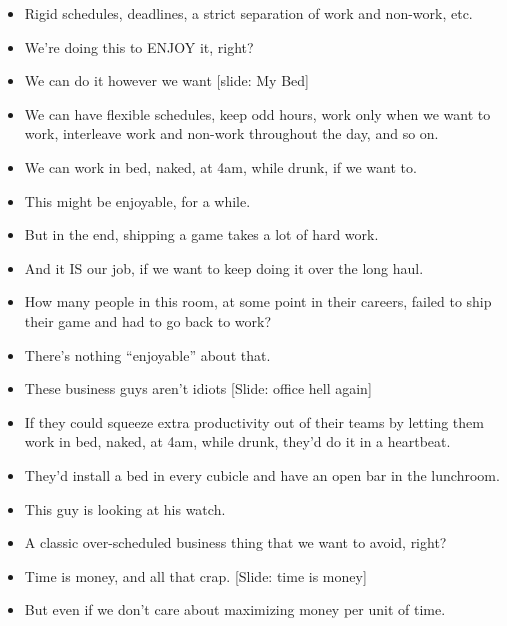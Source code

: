 \documentclass[12pt]{article}
\begin{document}
{\begin{itemize}
\item Rigid schedules, deadlines, a strict separation of work and non-work, etc.

\item We're doing this to ENJOY it, right?

\item We can do it however we want [slide:  My Bed]

\item We can have flexible schedules, keep odd hours, work only when we want to work, interleave work and non-work throughout the day, and so on.

\item We can work in bed, naked, at 4am, while drunk, if we want to.

\item This might be enjoyable, for a while.

\item But in the end, shipping a game takes a lot of hard work.

\item And it IS our job, if we want to keep doing it over the long haul.

\item How many people in this room, at some point in their careers, failed to ship their game and had to go back to work?

\item There's nothing ``enjoyable'' about that.

\item These business guys aren't idiots [Slide: office hell again]

\item If they could squeeze extra productivity out of their teams by letting them work in bed, naked, at 4am, while drunk, they'd do it in a heartbeat.

\item They'd install a bed in every cubicle and have an open bar in the lunchroom.

\item This guy is looking at his watch.

\item A classic over-scheduled business thing that we want to avoid, right?

\item Time is money, and all that crap. [Slide: time is money]

\item But even if we don't care about maximizing money per unit of time.


\end{itemize}}
\end{document}

